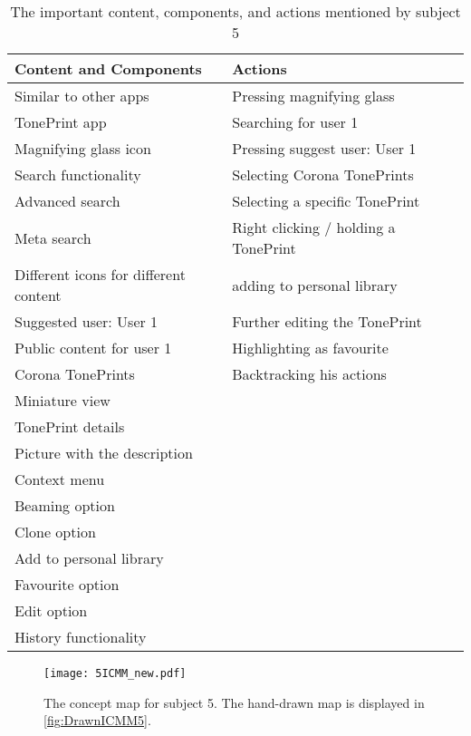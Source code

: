 \begin{table}[H]
\begin{minipage}[b]{\linewidth}\centering
	\begin{tabular} {|l|l|l|} \hline
		\rowcolor{xGray25} \textbf{Content and Components} & \textbf{Actions} \\  \hline
		Similar to other apps & Pressing magnifying glass \\
		TonePrint app & Searching for user 1 \\
		Magnifying glass icon & Pressing suggest user: User 1 \\
		Search functionality & Selecting Corona TonePrints \\
		Advanced search & Selecting a specific TonePrint \\
		Meta search & Right clicking / holding a TonePrint \\
		Different icons for different content & adding to personal library \\
		Suggested user: User 1 & Further editing the TonePrint \\
		Public content for user 1 & Highlighting as favourite \\
		Corona TonePrints & Backtracking his actions \\
		Miniature view &  \\
		TonePrint details & \\
		Picture with the description & \\
		Context menu & \\
		Beaming option & \\
		Clone option & \\
		Add to personal library & \\
		Favourite option & \\
		Edit option & \\
		History functionality & \\ \hline
	\end{tabular}
	\caption{The important content, components, and actions mentioned by subject 5}
	\label{tab:Subject5ContentActions}
\end{minipage}
\end{table}
%
\begin{figure}[H]
	\centering
	\texttt{[image: 5ICMM\_new.pdf]}
	\caption{The concept map for subject 5. The hand-drawn map is displayed in \autoref{fig:DrawnICMM5}.}
	\label{fig:ICMM5}
\end{figure}
%
\newpage

